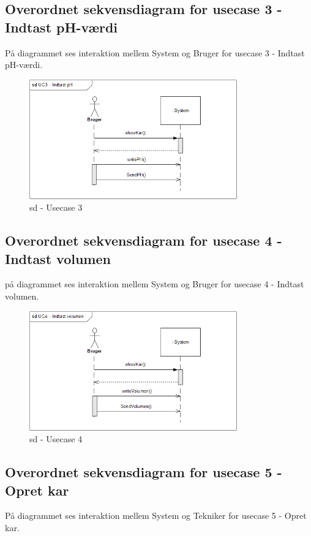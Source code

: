 \subsection{Overordnet sekvensdiagram for usecase 3 - Indtast pH-værdi}
På diagrammet ses interaktion mellem System og Bruger for usecase 3 - Indtast pH-værdi.

\begin{figure}[H]
    \centering
    \includegraphics[width=0.8\textwidth]{Systemarkitektur/OverordnedeSekvensdiagrammer/sd_UC3.PNG}
    \caption{sd - Usecase 3}
    \label{fig:sd_UC3}
\end{figure}

\subsection{Overordnet sekvensdiagram for usecase 4 - Indtast volumen}
på diagrammet ses interaktion mellem System og Bruger for usecase 4 - Indtast volumen.

\begin{figure}[H]
    \centering
    \includegraphics[width=0.8\textwidth]{Systemarkitektur/OverordnedeSekvensdiagrammer/sd_UC4.PNG}
    \caption{sd - Usecase 4}
    \label{fig:sd_UC4}
\end{figure}

\subsection{Overordnet sekvensdiagram for usecase 5 - Opret kar}
På diagrammet ses interaktion mellem System og Tekniker for usecase 5 - Opret kar.

